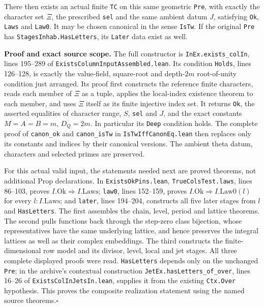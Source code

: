 \documentclass[11pt]{article}
\theoremstyle{definition}\newtheorem{definition}[theorem]{Definition}\newtheorem{remark}[theorem]{Remark}
\begin{document}
There then exists an actual finite \texttt{TC} on this
same geometric \texttt{Pre}, with exactly the character
set $\Xi$, the prescribed \texttt{sel} and the same
ambient datum $J$, satisfying \texttt{Ok},
\texttt{Laws} and \texttt{Law0}.  It may be chosen
canonical in the sense \texttt{IsTw}.  If the original
\texttt{Pre} has \nolinkurl{StagesInhab.HasLetters}, its
\texttt{Later} data exist as well.

\textbf{Proof and exact source scope.}
The full constructor is \texttt{InEx.exists\_colIn},
lines 195--289 of
\nolinkurl{ExistsColumnInputAssembled.lean}.
Its condition \texttt{Holds}, lines 126--128, is exactly
the value-field, square-root and depth-$2m$ root-of-unity
condition just arranged.  Its proof first constructs
the reference finite characters, reads each member of
$\Xi$ as a tuple, applies the local-index existence
theorem to each member, and uses $\Xi$ itself as its
finite injective index set.  It returns \texttt{Ok},
the asserted equalities of character range, $S$,
\texttt{sel} and $J$, and the exact constants
$M=A=B=m$, $D_Q=2m$.
In particular its \texttt{Deep} condition holds.
The complete proof of \texttt{canon\_ok} and
\texttt{canon\_isTw} in \texttt{IsTwIffCanonEq.lean}
then replaces only its constants and indices by their
canonical versions.  The ambient theta datum,
characters and selected primes are preserved.

For this actual valid input, the statements needed next
are proved theorems, not additional Prop declarations.
In
\texttt{ExistsOkPins.lean},
\texttt{TrueColsTest.laws}, lines 86--103, proves
$I.\mathrm{Ok}\Rightarrow I.\mathrm{Laws}$;
\texttt{law0}, lines 152--159, proves
$I.\mathrm{Ok}\Rightarrow I.\mathrm{Law0}(l)$ for
every $l:I.\mathrm{Laws}$; and \texttt{later},
lines 194--204, constructs all five later stages
from $l$ and \texttt{HasLetters}.
The first assembles the chain, level, period and lattice
theorems.  The second pulls functions back through the
step-zero class bijection, whose representatives have
the same underlying lattice, and hence preserves the
integral lattices as well as their complex embeddings.
The third constructs the finite-dimensional row model
and its divisor, level, local and jet stages.
All three complete displayed proofs were read.
\texttt{HasLetters} depends only on the unchanged
\texttt{Pre}; in the archive's contextual construction
\nolinkurl{JetEx.hasLetters_of_over}, lines 16--26 of
\nolinkurl{ExistsColInJetsIn.lean}, supplies it from
the existing \texttt{Ctx.Over} hypothesis.
This proves the composite realization statement using
the named source theorems.\hfill$\square$
\end{document}
